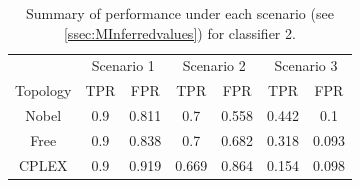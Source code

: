 \begin{table}[t]
    \centering
    \begin{tabular}{ccccccc}
        & \multicolumn{2}{c}{Scenario 1} & \multicolumn{2}{c}{Scenario 2} & \multicolumn{2}{c}{Scenario 3}\\
        \cmidrule(lr){2-3} \cmidrule(lr){4-5} \cmidrule(lr){6-7}
        Topology & TPR & FPR & TPR & FPR & TPR & FPR\\
        \midrule
        Nobel & 0.9 & 0.811 & 0.7   & 0.558 & 0.442 & 0.1 \\
        Free  & 0.9 & 0.838 & 0.7   & 0.682 & 0.318 & 0.093 \\
        CPLEX & 0.9 & 0.919 & 0.669 & 0.864 & 0.154 & 0.098 \\
    \end{tabular}
    \caption{Summary of performance under each scenario (see \cref{ssec:MInferredvalues}) for classifier 2.}
    \label{tbl:Rassumptionset2summary}
\end{table}
\noindent

